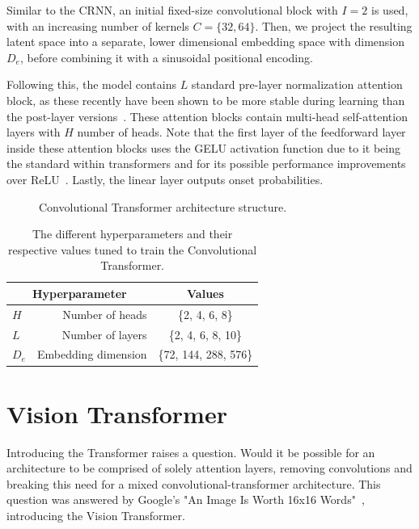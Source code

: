 Similar to the \gls{CRNN}, an initial fixed-size convolutional block with $I = 2$ is used, with an increasing number of kernels $C = \{32, 64\}$. Then, we project the resulting latent space into a separate, lower dimensional embedding space with dimension $D_e$, before combining it with a sinusoidal positional encoding. 

Following this, the model contains $L$ standard pre-layer normalization attention block, as these recently have been shown to be more stable during learning than the post-layer versions~\cite{pmlr-v119-xiong20b}. These attention blocks contain multi-head self-attention layers with $H$ number of heads. Note that the first layer of the feedforward layer inside these attention blocks uses the \gls{GELU} activation function due to it being the standard within transformers and for its possible performance improvements over \gls{ReLU}~\cite{devlin-etal-2019-bert, hendrycks2023gaussianerrorlinearunits}. Lastly, the linear layer outputs onset probabilities.

\begin{figure}[H]
    \centering
    
    \caption{Convolutional Transformer architecture structure.}
    \label{CTFigure}
\end{figure}

\begin{table}[H]
    \centering
    \begin{tabular}{lr|c}
        \multicolumn{2}{c|}{Hyperparameter} & Values       \\
        \hline
        $H$ & Number of heads     & \{2, 4, 6, 8\} \\
        $L$ & Number of layers      & \{2, 4, 6, 8, 10\} \\
        $D_e$ & Embedding dimension      & \{72, 144, 288, 576\} \\
    \end{tabular}
    \caption{The different hyperparameters and their respective values tuned to train the Convolutional Transformer.}
    \label{CTHyperparams}
\end{table}

\section{Vision Transformer}

Introducing the Transformer raises a question. Would it be possible for an architecture to be comprised of solely attention layers, removing convolutions and breaking this need for a mixed convolutional-transformer architecture. This question was answered by Google's "An Image Is Worth 16x16 Words"~\cite{dosovitskiy2021imageworth16x16words}, introducing the Vision Transformer.

